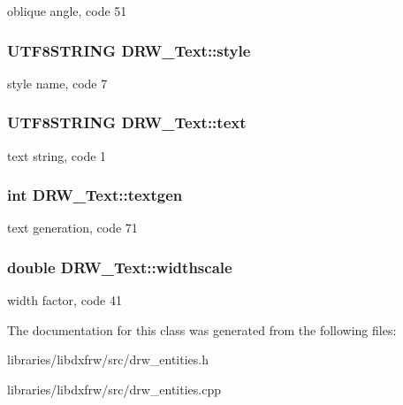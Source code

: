 oblique angle, code 51 \hypertarget{classDRW__Text_a11fa7c1b5a6fccafe2991bad2413cfa8}{
\subsubsection[{style}]{\setlength{\rightskip}{0pt plus 5cm}U\-T\-F8\-S\-T\-R\-I\-N\-G D\-R\-W\-\_\-\-Text\-::style}}\label{classDRW__Text_a11fa7c1b5a6fccafe2991bad2413cfa8}
style name, code 7 \hypertarget{classDRW__Text_a87a40d4523371ee0cc250be0fc8834cd}{
\subsubsection[{text}]{\setlength{\rightskip}{0pt plus 5cm}U\-T\-F8\-S\-T\-R\-I\-N\-G D\-R\-W\-\_\-\-Text\-::text}}\label{classDRW__Text_a87a40d4523371ee0cc250be0fc8834cd}
text string, code 1 \hypertarget{classDRW__Text_ada45df3aae10844afc1861261e40869e}{
\subsubsection[{textgen}]{\setlength{\rightskip}{0pt plus 5cm}int D\-R\-W\-\_\-\-Text\-::textgen}}\label{classDRW__Text_ada45df3aae10844afc1861261e40869e}
text generation, code 71 \hypertarget{classDRW__Text_a17468f7c0e1bd0b1c6da87cc9300b7e1}{
\subsubsection[{widthscale}]{\setlength{\rightskip}{0pt plus 5cm}double D\-R\-W\-\_\-\-Text\-::widthscale}}\label{classDRW__Text_a17468f7c0e1bd0b1c6da87cc9300b7e1}
width factor, code 41 

The documentation for this class was generated from the following files\-:\begin{DoxyCompactItemize}
\item 
libraries/libdxfrw/src/drw\-\_\-entities.\-h\item 
libraries/libdxfrw/src/drw\-\_\-entities.\-cpp\end{DoxyCompactItemize}
